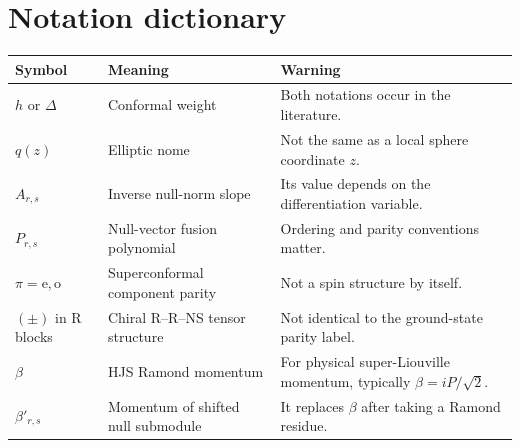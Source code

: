 \documentclass[11pt]{article}
\begin{document}
\section{Notation dictionary}

\begin{center}
\begin{tabularx}{\textwidth}{@{}L{0.25\textwidth}L{0.25\textwidth}X@{}}
\toprule
Symbol & Meaning & Warning\\
\midrule
\(h\) or \(\Delta\) & Conformal weight & Both notations occur in the
literature.\\
\(q(z)\) & Elliptic nome & Not the same as a local sphere coordinate \(z\).\\
\(A_{r,s}\) & Inverse null-norm slope & Its value depends on the
differentiation variable.\\
\(P_{r,s}\) & Null-vector fusion polynomial & Ordering and parity conventions
matter.\\
\(\pi=\mathrm e,\mathrm o\) & Superconformal component parity & Not a spin
structure by itself.\\
\((\pm)\) in R blocks & Chiral R--R--NS tensor structure & Not identical to
the ground-state parity label.\\
\(\beta\) & HJS Ramond momentum & For physical super-Liouville momentum,
typically \(\beta=iP/\sqrt2\).\\
\(\beta'_{r,s}\) & Momentum of shifted null submodule & It replaces
\(\beta\) after taking a Ramond residue.\\
\bottomrule
\end{tabularx}
\end{center}
\end{document}
